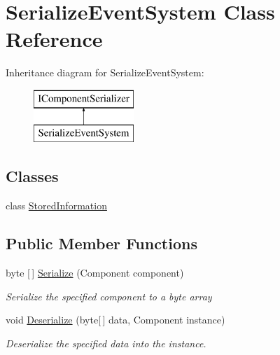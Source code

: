 \hypertarget{class_serialize_event_system}{}\section{Serialize\+Event\+System Class Reference}
\label{class_serialize_event_system}
Inheritance diagram for Serialize\+Event\+System\+:\begin{figure}[H]
\begin{center}
\leavevmode
\includegraphics[height=2.000000cm]{class_serialize_event_system}
\end{center}
\end{figure}
\subsection*{Classes}
\begin{DoxyCompactItemize}
\item 
class \hyperlink{class_serialize_event_system_1_1_stored_information}{Stored\+Information}
\end{DoxyCompactItemize}
\subsection*{Public Member Functions}
\begin{DoxyCompactItemize}
\item 
byte \mbox{[}$\,$\mbox{]} \hyperlink{class_serialize_event_system_a433cd679d73a8b4c4823e960b224231b}{Serialize} (Component component)
\begin{DoxyCompactList}\small\item\em Serialize the specified component to a byte array \end{DoxyCompactList}\item 
void \hyperlink{class_serialize_event_system_a27ee6101f51abf181d2bdf755708cdeb}{Deserialize} (byte\mbox{[}$\,$\mbox{]} data, Component instance)
\begin{DoxyCompactList}\small\item\em Deserialize the specified data into the instance. \end{DoxyCompactList}\end{DoxyCompactItemize}


